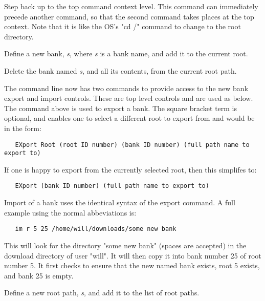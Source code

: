       Step back up to the top command context level.
      This command can immediately precede another command, so that the second
      command takes places at the top context.
      Note that it is like the OS's "cd /" command to change to the root
      directory.

      Define a new bank, \textsl{s}, where \textsl{s} is a bank name,
      and add it to the current root.

      Delete the bank named \textsl{s}, and all its contents,
      from the current root path.

      The command line now has two commands to provide access to the new bank
      export and import controls. These are top level controls and are used as
      below.  The command above is used to export a bank. The square bracket term
      is optional, and enables one to select a different root to export from and
      would be in the form:

\begin{verbatim}
   EXport Root (root ID number) (bank ID number) (full path name to export to)
\end{verbatim}

   If one is happy to export from the currently selected root, then this
   simplifes to:

\begin{verbatim}
   EXport (bank ID number) (full path name to export to)
\end{verbatim}

      Import of a bank uses the identical syntax of the export command.
      A full example using the normal abbeviations is:

\begin{verbatim}
   im r 5 25 /home/will/downloads/some new bank
\end{verbatim}

      This will look for the directory "some new bank" (spaces are accepted) in
      the download directory of user "will". It will then copy it into bank number
      25 of root number 5. It first checks to ensure that the new named bank
      exists, root 5 exists, and bank 25 is empty.

      Define a new root path, \textsl{s}, and add it to the list of root paths.


